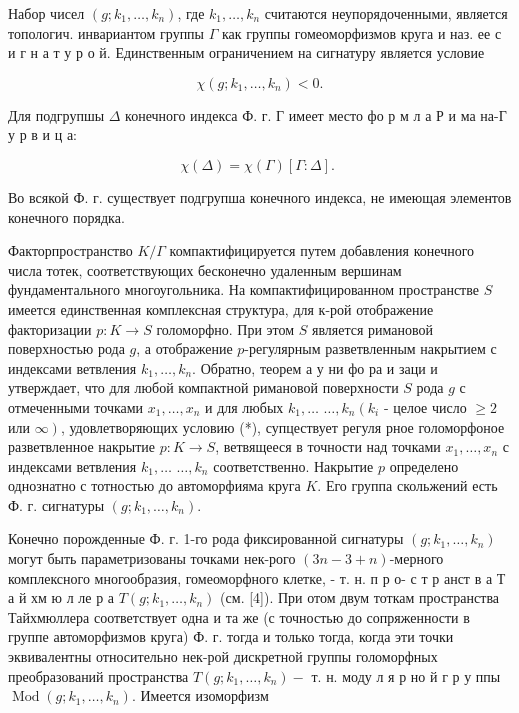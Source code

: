 \documentclass[10pt]{article}
\begin{document}
Набор чисел $\left(g ; k_{1}, \ldots, k_{n}\right)$, где $k_{1}, \ldots, k_{n}$ считаются неупорядоченными, является топологич. инвариантом группы $\Gamma$ как группы гомеоморфизмов круга и наз. ее с и г н а т у р о й. Единственным ограничением на сигнатуру является условие



\[

\chi\left(g ; k_{1}, \ldots, k_{n}\right)<0 .

\]



Для подгрупшы $\Delta$ конечного индекса Ф. г. Г имеет место фо р м л а Р и ма на-Г у р в и ц а:



\[

\chi(\Delta)=\chi(\Gamma)[\Gamma: \Delta] \text {. }

\]



Во всякой Ф. г. существует подгрупша конечного индекса, не имеющая элементов конечного порядка.



Факторпространство $K / \Gamma$ компактифицируется путем добавления конечного числа тотек, соответствующих бесконечно удаленным вершинам фундаментального многоугольника. На компактифицированном пространстве $S$ имеется единственная комплексная структура, для к-рой отображение факторизации $p: K \rightarrow S$ голоморфно. При этом $S$ является римановой поверхностью рода $g$, а отображение $p$-регулярным разветвленным накрытием с индексами ветвления $k_{1}, \ldots, k_{n}$. Обратно, теорем а у ни фо ра и заци и утверждает, что для любой компактной римановой поверхности $S$ рода $g$ с отмеченными точками $x_{1}, \ldots, x_{n}$ и для любых $k_{1}, \ldots$ $\ldots, k_{n}\left(k_{i}\right.$ - целое число $\geqslant 2$ или $\left.\infty\right)$, удовлетворяющих условию (*), супцествует регуля рное голоморфоное разветвленное накрытие $p: K \longrightarrow S$, ветвящееся в точности над точками $x_{1}, \ldots, x_{n}$ с индексами ветвления $k_{1}, \ldots$ $\ldots, k_{n}$ соответственно. Накрытие $p$ определено однознатно с тотностью до автоморфияма круга $K$. Его группа скольжений есть Ф. г. сигнатуры $\left(g ; k_{1}, \ldots, k_{n}\right)$.



Конечно порожденные Ф. г. 1-го рода фиксированной сигнатуры $\left(g ; k_{1}, \ldots, k_{n}\right)$ могут быть параметризованы точками нек-рого $(3 n-3+n)$-мерного комплексного многообразия, гомеоморфного клетке, - т. н. п р о- с т р анст в а Т а й хм ю л ле р а $T\left(g ; k_{1}, \ldots, k_{n}\right)$ (см. [4]). При отом двум тоткам пространства Тайхмюллера соответствует одна и та же (с точностью до сопряженности в группе автоморфизмов круга) Ф. г. тогда и только тогда, когда эти точки эквивалентны относительно нек-рой дискретной группы голоморфных преобразований пространства $T\left(g ; k_{1}, \ldots, k_{n}\right)-$ т. н. моду л я р но й г р у ппы $\operatorname{Mod}\left(g ; k_{1}, \ldots, k_{n}\right)$. Имеется изоморфизм
\end{document}

